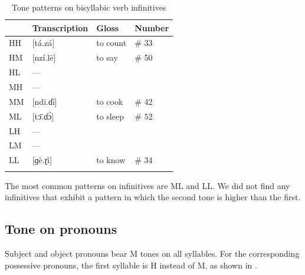 \documentclass[output=paper,colorlinks,citecolor=brown
]{langscibook}
\begin{document}
\begin{table}
\caption{Tone patterns on bisyllabic verb infinitives}
\label{tab:olson:toneverbs}
 \begin{tabular}{llll}
  \lsptoprule
    & Transcription & Gloss & Number \\
  \midrule
 HH & [tá.zá]  & to count & \# 33 \\
 HM & [nzí.lē] & to say & \# 50 \\
 HL & — & & \\
 MH & — & & \\
 MM & [ndī.ɗī] & to cook & \# 42 \\
 ML & [tɔ̄.ɗɔ̀]  & to sleep & \# 52 \\
 LH & — & & \\
 LM & — & & \\
 LL & [ɡè.ɽì] & to know & \# 34 \\
  \lspbottomrule
 \end{tabular}
\end{table}

The most common patterns on infinitives are ML and LL. We did not find any infinitives that exhibit a pattern in which the second tone is higher than the first.

\subsection{Tone on pronouns}

Subject and object pronouns bear M tones on all syllables. For the corresponding possessive pronouns, the first syllable is H instead of M, as shown in .

\begin{table}
\caption{Tone patterns on pronouns}
\label{tab:olson:tonepronouns}
\end{table}
\end{document}
